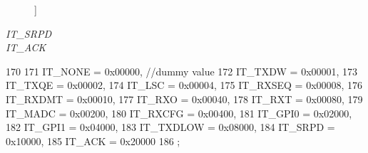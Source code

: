 \begin{Desc}
\begin{description}
{}]\item[{\em 
\hypertarget{namespaceiGbReg_ab881f740bd3545d8eb42b05253752e9ca72e21e36635d99d0b77bd21cd52a4815}{
IT\_\-SRPD}
\label{namespaceiGbReg_ab881f740bd3545d8eb42b05253752e9ca72e21e36635d99d0b77bd21cd52a4815}
}]\item[{\em 
\hypertarget{namespaceiGbReg_ab881f740bd3545d8eb42b05253752e9ca70a1f84a3694d89a9950f0aac28d198a}{
IT\_\-ACK}
\label{namespaceiGbReg_ab881f740bd3545d8eb42b05253752e9ca70a1f84a3694d89a9950f0aac28d198a}
}]\end{description}
\end{Desc}




\begin{DoxyCode}
170 {
171     IT_NONE    = 0x00000, //dummy value
172     IT_TXDW    = 0x00001,
173     IT_TXQE    = 0x00002,
174     IT_LSC     = 0x00004,
175     IT_RXSEQ   = 0x00008,
176     IT_RXDMT   = 0x00010,
177     IT_RXO     = 0x00040,
178     IT_RXT     = 0x00080,
179     IT_MADC    = 0x00200,
180     IT_RXCFG   = 0x00400,
181     IT_GPI0    = 0x02000,
182     IT_GPI1    = 0x04000,
183     IT_TXDLOW  = 0x08000,
184     IT_SRPD    = 0x10000,
185     IT_ACK     = 0x20000
186 };
\end{DoxyCode}



